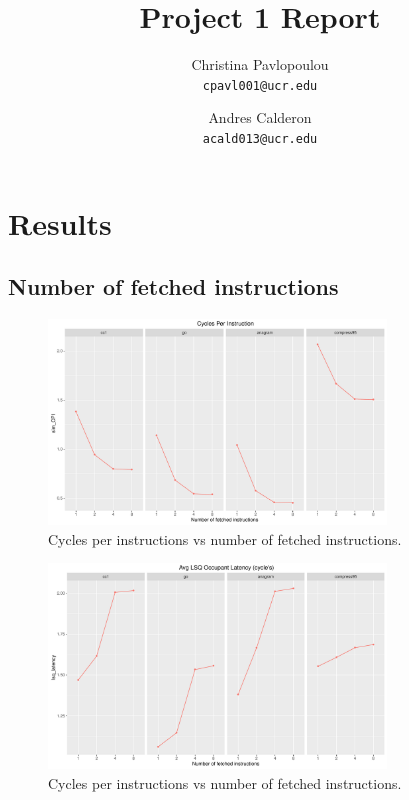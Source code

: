 \documentclass[10pt]{scrartcl}
\title{Project 1 Report}
\author{
   Christina Pavlopoulou\\
  \small \texttt{cpavl001@ucr.edu}
  \and
   Andres Calderon\\
  \small \texttt{acald013@ucr.edu}
}
\begin{document}
\maketitle


\section{Results}

\subsection{Number of fetched instructions}

\begin{figure}[h]
  \centering
  \includegraphics[width=0.8\textwidth]{Plots/plot_F_sim_CPI}
  \caption{Cycles per instructions vs number of fetched instructions.}\label{fig:f_sim_cpi}
\end{figure}

\begin{figure}[h]
  \centering
  \includegraphics[width=0.8\textwidth]{Plots/plot_F_lsq_latency}
  \caption{Cycles per instructions vs number of fetched instructions.}\label{fig:f_lsq_latency}
\end{figure}

\FloatBarrier
\end{document}
